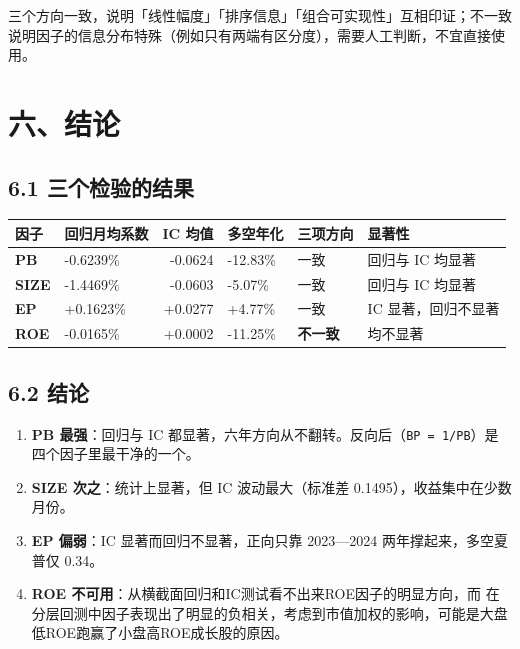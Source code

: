 \documentclass[UTF8,a4paper,11pt]{ctexart}
\begin{document}
三个方向一致，说明「线性幅度」「排序信息」「组合可实现性」互相印证；不一致说明因子的信息分布特殊（例如只有两端有区分度），需要人工判断，不宜直接使用。

{}
\section*{六、结论}

{}
\subsection*{6.1 三个检验的结果}

\begin{table}[htbp]
\centering
\small
\begin{tabularx}{\textwidth}{@{}YYRYYY@{}}
\toprule
因子 & 回归月均系数 & IC 均值 & 多空年化 & 三项方向 & 显著性 \\
\midrule
\textbf{PB} & -0.6239\% & -0.0624 & -12.83\% & 一致 & 回归与 IC 均显著 \\
\textbf{SIZE} & -1.4469\% & -0.0603 & -5.07\% & 一致 & 回归与 IC 均显著 \\
\textbf{EP} & +0.1623\% & +0.0277 & +4.77\% & 一致 & IC 显著，回归不显著 \\
\textbf{ROE} & -0.0165\% & +0.0002 & -11.25\% & \textbf{不一致} & 均不显著 \\
\bottomrule
\end{tabularx}
\end{table}

{}
\subsection*{6.2 结论}

\begin{enumerate}[leftmargin=2.2em,itemsep=2pt,topsep=3pt]
\item 
\textbf{PB 最强}：回归与 IC 都显著，六年方向从不翻转。反向后（\texttt{BP = 1/PB}）是四个因子里最干净的一个。

\item 
\textbf{SIZE 次之}：统计上显著，但 IC 波动最大（标准差 0.1495），收益集中在少数月份。

\item 
\textbf{EP 偏弱}：IC 显著而回归不显著，正向只靠 2023—2024 两年撑起来，多空夏普仅 0.34。

\item 
\textbf{ROE 不可用}：从横截面回归和IC测试看不出来ROE因子的明显方向，而 在分层回测中因子表现出了明显的负相关，考虑到市值加权的影响，可能是大盘低ROE跑赢了小盘高ROE成长股的原因。

\end{enumerate}
\end{document}
